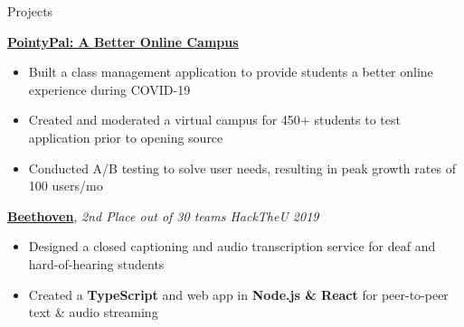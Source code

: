 \documentclass{resume/resume}
\begin{document}
%
%
%
\begin{rSection}{Projects}

    \href{https://github.com/UtahTriangle/pointypal}{\bf PointyPal: A Better Online Campus}
    \vspace{-6pt}
    \begin{itemize}[nosep]
        \item Built a class management application to provide students a better online experience during COVID-19
        \item Created and moderated a virtual campus for 450+ students to test application prior to opening source 
        \item Conducted A/B testing to solve user needs, resulting in peak growth rates of 100 users/mo
    \end{itemize}

    
    \href{https://devpost.com/software/beethoven-t9ud86}{\bf Beethoven}, {\em 2nd Place out of 30 teams
    \hfill HackTheU 2019}
    \vspace{-6pt}
    \begin{itemize}[nosep]
        \item Designed a closed captioning and audio transcription service for deaf and hard-of-hearing students
        \item Created a {\bf TypeScript} and  web app in {\bf Node.js \& React} for peer-to-peer text \& audio streaming
    \end{itemize}
    

\end{rSection}
\end{document}
